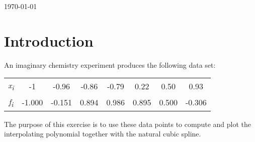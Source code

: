 \documentclass{article}
\begin{document}
\begin{titlepage}
	
	
	\vfill\vfill\vfill %
	
	{\large\today} %
	
	
	 
	
	\vfill %
	
\end{titlepage}


\section{Introduction}\label{sec:intro}
An imaginary chemistry experiment produces the following data set:

  \begin{table}[!ht]
    \large        %
    \centering    %
    \begin{tabular}{|c|c|c|c|c|c|c|c|}
    \hline
    \it{x}\textsubscript{i}&-1&-0.96&-0.86&-0.79&0.22&0.50&0.93\\     %
    \it{f}\textsubscript{i}&-1.000&-0.151&0.894&0.986&0.895&0.500&-0.306\\
    \hline        %
    \end{tabular}
  \end{table}

The purpose of this exercise is to use these data points to compute and plot the interpolating polynomial together with the natural cubic spline.\\
\end{document}
